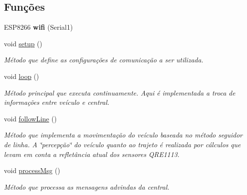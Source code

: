 \subsection*{Funções}
\begin{DoxyCompactItemize}
\item 
\mbox{\label{parking-solution_8ino_a3ff51a8faea0d47e46d5ae9fceb45988}} 
E\+S\+P8266 {\bfseries wifi} (Serial1)
\item 
\mbox{\label{parking-solution_8ino_a4fc01d736fe50cf5b977f755b675f11d}} 
void \mbox{\hyperlink{parking-solution_8ino_a4fc01d736fe50cf5b977f755b675f11d}{setup}} ()
\begin{DoxyCompactList}\small\item\em Método que define as configurações de comunicação a ser utilizada. \end{DoxyCompactList}\item 
\mbox{\label{parking-solution_8ino_afe461d27b9c48d5921c00d521181f12f}} 
void \mbox{\hyperlink{parking-solution_8ino_afe461d27b9c48d5921c00d521181f12f}{loop}} ()
\begin{DoxyCompactList}\small\item\em Método principal que executa continuamente. Aqui é implementada a troca de informações entre veículo e central. \end{DoxyCompactList}\item 
\mbox{\label{parking-solution_8ino_a1fa00cb28ff23a19c53ea81f55d85a66}} 
void \mbox{\hyperlink{parking-solution_8ino_a1fa00cb28ff23a19c53ea81f55d85a66}{follow\+Line}} ()
\begin{DoxyCompactList}\small\item\em Método que implementa a movimentação do veículo baseada no método seguidor de linha. A \char`\"{}percepção\char`\"{} do veículo quanto ao trajeto é realizada por cálculos que levam em conta a refletância atual dos sensores Q\+R\+E1113. \end{DoxyCompactList}\item 
\mbox{\label{parking-solution_8ino_a5e884bfc5853965874210cfb2edbfa14}} 
void \mbox{\hyperlink{parking-solution_8ino_a5e884bfc5853965874210cfb2edbfa14}{process\+Msg}} ()
\begin{DoxyCompactList}\small\item\em Método que processa as mensagens advindas da central. \end{DoxyCompactList}\item 

\end{DoxyCompactItemize}
